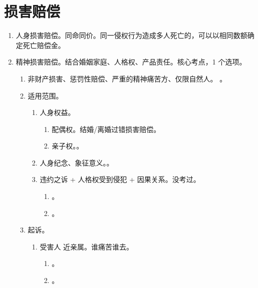 \section{损害赔偿}
\begin{enumerate}
  \item 人身损害赔偿。同命同价。同一侵权行为造成多人死亡的，可以以相同数额确定死亡赔偿金。
  \item 精神损害赔偿。结合婚姻家庭、人格权、产品责任。核心考点，1 个选项。
        \begin{enumerate}
          \item 非财产损害、惩罚性赔偿、严重的精神痛苦方、仅限自然人。
                。
          \item 适用范围。
                \begin{enumerate}
                  \item 人身权益。
                        \begin{enumerate}
                          \item 配偶权。结婚/离婚过错损害赔偿。
                          \item 亲子权。。
                        \end{enumerate}
                  \item 人身纪念、象征意义。。
                  \item 违约之诉 + 人格权受到侵犯 + 因果关系。没考过。
                        \begin{enumerate}
                          \item {}。
                          \item {}。
                        \end{enumerate}
                \end{enumerate}
          \item 起诉。
                \begin{enumerate}
                  \item 受害人 \yjt 近亲属。谁痛苦谁去。
                        \begin{enumerate}
                          \item {}。
                          \item {}。

\end{enumerate}
\end{enumerate}
\end{enumerate}
\end{enumerate}

